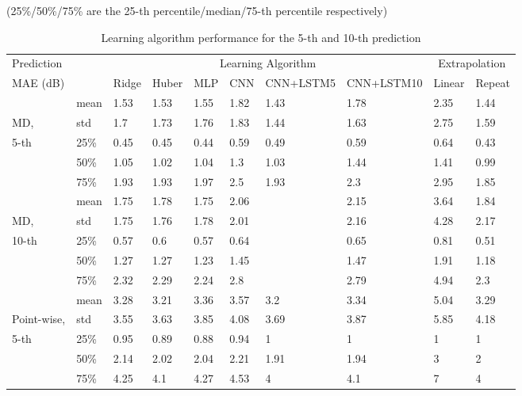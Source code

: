 \begin{table}[p]
\centering
\caption{Learning algorithm performance for the 5-th and 10-th prediction}
(25\%/50\%/75\% are the 25-th percentile/median/75-th percentile respectively)
\label{tab:ml_tab}

\hspace*{-1.5cm}
\begin{tabular}{@{}llllllllll@{}}
\toprule
Prediction &      &   \multicolumn{6}{c}{Learning Algorithm} &  \multicolumn{2}{c}{Extrapolation}  \\
\cmidrule(lr){3-8} \cmidrule(lr){9-10}
\acs{MAE} (dB) &      & Ridge & Huber & \acs{MLP}  & \acs{CNN}  & CNN+LSTM5 & CNN+LSTM10 & Linear & Repeat \\ \midrule
& mean & 1.53  & 1.53  & 1.55 & 1.82 & 1.43     & 1.78      & 2.35   & 1.44   \\
MD, & std  & 1.7   & 1.73  & 1.76 & 1.83 & 1.44     & 1.63      & 2.75   & 1.59   \\
5-th& 25\% & 0.45  & 0.45  & 0.44 & 0.59 & 0.49     & 0.59      & 0.64   & 0.43   \\
& 50\% & 1.05  & 1.02  & 1.04 & 1.3  & 1.03     & 1.44      & 1.41   & 0.99   \\
& 75\% & 1.93  & 1.93  & 1.97 & 2.5  & 1.93     & 2.3       & 2.95   & 1.85   \\
\midrule
& mean & 1.75  & 1.78  & 1.75 & 2.06 &          & 2.15      & 3.64   & 1.84   \\
MD, & std  & 1.75  & 1.76  & 1.78 & 2.01 &          & 2.16      & 4.28   & 2.17   \\
10-th & 25\% & 0.57  & 0.6   & 0.57 & 0.64 &          & 0.65      & 0.81   & 0.51   \\
& 50\% & 1.27  & 1.27  & 1.23 & 1.45 &          & 1.47      & 1.91   & 1.18   \\
& 75\% & 2.32  & 2.29  & 2.24 & 2.8  &          & 2.79      & 4.94   & 2.3    \\
\midrule
& mean & 3.28  & 3.21  & 3.36 & 3.57 & 3.2      & 3.34      & 5.04   & 3.29   \\
Point-wise, & std  & 3.55  & 3.63  & 3.85 & 4.08 & 3.69     & 3.87      & 5.85   & 4.18   \\
5-th& 25\% & 0.95  & 0.89  & 0.88 & 0.94 & 1        & 1         & 1      & 1      \\
& 50\% & 2.14  & 2.02  & 2.04 & 2.21 & 1.91     & 1.94      & 3      & 2      \\
& 75\% & 4.25  & 4.1   & 4.27 & 4.53 & 4        & 4.1       & 7      & 4      \\

\end{tabular}
\end{table}
